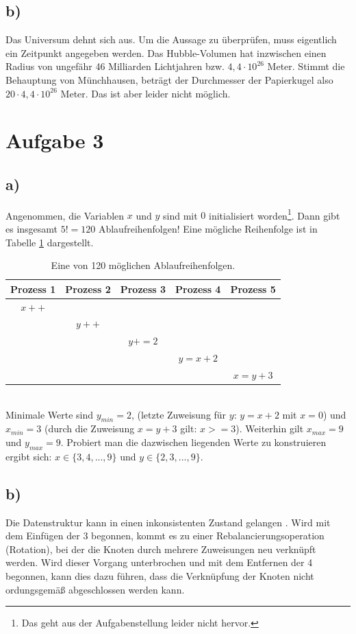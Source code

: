 \documentclass[11pt,a4paper,DIV=10,]{scrartcl}
\begin{document}
\subsection*{b)}
Das Universum dehnt sich aus. Um die Aussage zu überprüfen, muss eigentlich ein Zeitpunkt angegeben werden. Das Hubble-Volumen hat inzwischen einen Radius von ungefähr 46 Milliarden Lichtjahren bzw. $4,4\cdot 10^{26}$ Meter. Stimmt die Behauptung von Münchhausen, beträgt der Durchmesser der Papierkugel also $20\cdot 4,4\cdot 10^{26}$ Meter. Das ist aber leider nicht möglich.



\section*{Aufgabe 3}
\subsection*{a)}
Angenommen, die Variablen $x$ und $y$ sind mit $0$ initialisiert worden\footnote{Das geht aus der Aufgabenstellung leider nicht hervor.}. Dann gibt es insgesamt $5!=120$ Ablaufreihenfolgen! Eine mögliche Reihenfolge ist in Tabelle \ref{t1} dargestellt.
\begin{table}[h]
\center
\begin{tabular}{ccccc}
Prozess 1 & Prozess 2 & Prozess 3 & Prozess 4 & Prozess 5 \\ 
\hline 
$x++$ &&&& \\ 
& $y++$ &&&\\
&& $y+=2$ &&\\
&&& $y=x+2$ & \\
&&&& $x=y+3$  \\
\hline 
\end{tabular} 
\caption{Eine von 120 möglichen Ablaufreihenfolgen.}
\label{t1}
\end{table}\\
Minimale Werte sind $y_{min}=2$, (letzte Zuweisung für $y$: $y=x+2$ mit $x=0$) und $x_{min}=3$ (durch die Zuweisung $x=y+3$ gilt: $x>=3$). Weiterhin gilt $x_{max}=9$ und $y_{max}=9$. 
Probiert man die dazwischen liegenden Werte zu konstruieren ergibt sich: $x\in\{3,4,...,9\}$ und $y\in\{2,3,...,9\}$.
\subsection*{b)}
Die Datenstruktur kann in einen inkonsistenten Zustand gelangen \cite[vgl.][S. 16]{Maurer.2012}. Wird mit dem Einfügen der 3 begonnen, kommt es zu einer Rebalancierungsoperation (Rotation), bei der die Knoten durch mehrere Zuweisungen neu verknüpft werden. Wird dieser Vorgang unterbrochen und mit dem Entfernen der 4 begonnen, kann dies dazu führen, dass die Verknüpfung der Knoten nicht ordungsgemäß abgeschlossen werden kann. 
\end{document}
